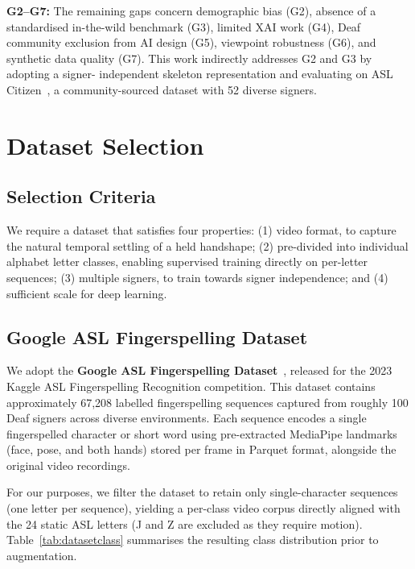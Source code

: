 \documentclass[conference]{IEEEtran}
\begin{document}
\textbf{G2--G7:} The remaining gaps concern demographic bias (G2), absence of a
standardised in-the-wild benchmark (G3), limited XAI work (G4), Deaf community
exclusion from AI design (G5), viewpoint robustness (G6), and synthetic data
quality (G7). This work indirectly addresses G2 and G3 by adopting a signer-
independent skeleton representation and evaluating on ASL Citizen~\cite{desai2023},
a community-sourced dataset with 52 diverse signers.

\section{Dataset Selection}
\label{sec:dataset}

\subsection{Selection Criteria}

We require a dataset that satisfies four properties: (1) video format, to
capture the natural temporal settling of a held handshape; (2) pre-divided into
individual alphabet letter classes, enabling supervised training directly on
per-letter sequences; (3) multiple signers, to train towards signer independence;
and (4) sufficient scale for deep learning.

\subsection{Google ASL Fingerspelling Dataset}

We adopt the \textbf{Google ASL Fingerspelling Dataset}~\cite{googleaslfs},
released for the 2023 Kaggle ASL Fingerspelling Recognition competition. This
dataset contains approximately 67,208 labelled fingerspelling sequences captured
from roughly 100 Deaf signers across diverse environments. Each sequence encodes
a single fingerspelled character or short word using pre-extracted MediaPipe
landmarks (face, pose, and both hands) stored per frame in Parquet format,
alongside the original video recordings.

For our purposes, we filter the dataset to retain only single-character
sequences (one letter per sequence), yielding a per-class video corpus directly
aligned with the 24 static ASL letters (J and Z are excluded as they require
motion). Table~\ref{tab:datasetclass} summarises the resulting class distribution
prior to augmentation.
\end{document}
